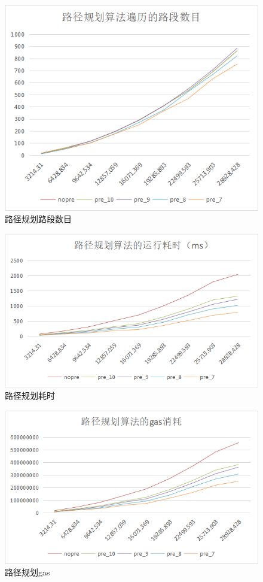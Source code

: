\begin{figure}
  \centering
  \includegraphics[width=1.0\textwidth]{figures/路径规划路段数目}
  \caption{路径规划路段数目}\label{fig:navRoads}
\end{figure}

\begin{figure}
  \centering
  \includegraphics[width=1.0\textwidth]{figures/路径规划耗时}
  \caption{路径规划耗时}\label{fig:navTime}
\end{figure}

\begin{figure}
  \centering
  \includegraphics[width=1.0\textwidth]{figures/路径规划gas}
  \caption{路径规划gas}\label{fig:navGas}
\end{figure}

